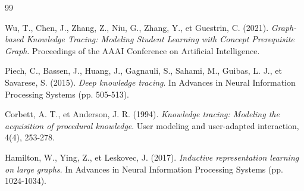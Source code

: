 \documentclass[11pt, a4paper]{article}
\begin{document}
\begin{thebibliography}{99}

     Wu, T., Chen, J., Zhang, Z., Niu, G., Zhang, Y., et Guestrin, C. (2021). \textit{Graph-based Knowledge Tracing: Modeling Student Learning with Concept Prerequisite Graph}. Proceedings of the AAAI Conference on Artificial Intelligence.

     Piech, C., Bassen, J., Huang, J., Gagnauli, S., Sahami, M., Guibas, L. J., et Savarese, S. (2015). \textit{Deep knowledge tracing}. In Advances in Neural Information Processing Systems (pp. 505-513).

     Corbett, A. T., et Anderson, J. R. (1994). \textit{Knowledge tracing: Modeling the acquisition of procedural knowledge}. User modeling and user-adapted interaction, 4(4), 253-278.

     Hamilton, W., Ying, Z., et Leskovec, J. (2017). \textit{Inductive representation learning on large graphs}. In Advances in Neural Information Processing Systems (pp. 1024-1034).

\end{thebibliography}
\end{document}
